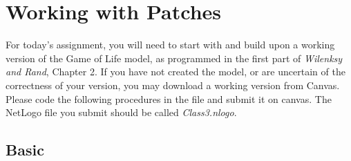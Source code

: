 \documentclass[11pt]{book}
\begin{document}
\chapter{Working with Patches}

For today's assignment, you will need to start with and build upon a working version of the Game of Life model, as programmed in the first part of {\it Wilenksy and Rand}, Chapter 2. If you have not created the model, or are uncertain of the correctness of your version, you may download a working version from Canvas. Please code the following procedures in the file and submit it on canvas. The NetLogo file you submit should be called {\it Class3.nlogo}.

\section{Basic}
\end{document}
